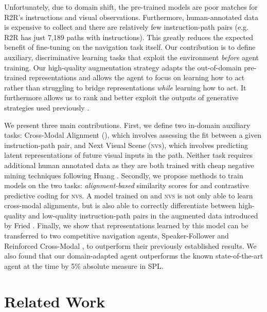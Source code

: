 \documentclass[10pt,twocolumn,letterpaper]{article}
\newcommand{\tasknvs}{\textsc{nvs}}
\begin{document}
Unfortunately, due to domain shift, the pre-trained models are poor matches for R2R's instructions and visual observations. Furthermore, human-annotated data is expensive to collect and there are relatively few instruction-path pairs (e.g. R2R has just 7,189 paths with instructions). This greatly reduces the expected benefit of fine-tuning \cite{Girshick:2014:Finetuning,Zeiler:2014:Pretraining} on the navigation task itself. Our contribution is to define auxiliary, discriminative learning tasks that exploit the environment \textit{before} agent training. Our high-quality augmentation strategy adapts the out-of-domain pre-trained representations and allows the agent to focus on learning how to act rather than struggling to bridge representations \textit{while} learning how to act. It furthermore allows us to rank and better exploit the outputs of generative strategies used previously \cite{Fried:2018:Speaker}.





We present three main contributions. First, we define two in-domain auxiliary tasks: Cross-Modal Alignment ({\taskcma}), which involves assessing the fit between a given instruction-path pair, and Next Visual Scene ({\tasknvs}), which involves predicting latent representations of future visual inputs in the path. Neither task requires additional human annotated data as they are both trained with cheap negative mining techniques following Huang \etal \cite{Huang:2019:Discriminator}. Secondly, we propose methods to train models on the two tasks: \emph{alignment-based} similarity scores for {\taskcma} and contrastive predictive coding \cite{Oord2018RepresentationLW} for {\tasknvs}. A model trained on {\taskcma} and {\tasknvs} is not only able to learn cross-modal alignments, but is also able to correctly differentiate between high-quality and low-quality instruction-path pairs in the augmented data introduced by Fried \etal \cite{Fried:2018:Speaker}. Finally, we show that representations learned by this model can be transferred to two competitive navigation agents, Speaker-Follower \cite{Fried:2018:Speaker} and Reinforced Cross-Modal \cite{Wang:2018:RCM}, to outperform their previously established results. We also found that our domain-adapted agent outperforms the known state-of-the-art agent at the time by 5\% absolute measure in SPL.






%
 
\section{Related Work}
\end{document}
